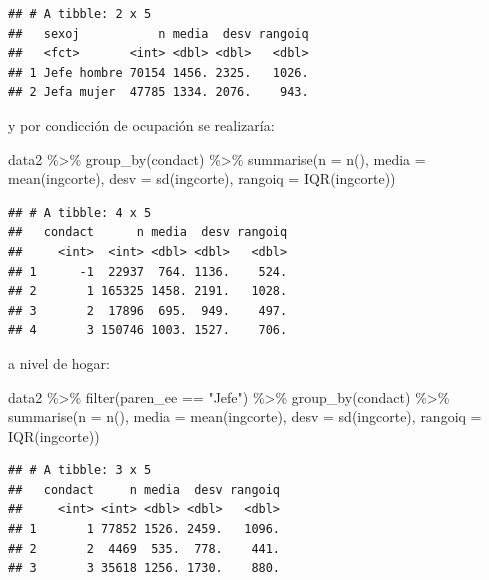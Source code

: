 \documentclass[
  12pt,
]{book}
\newenvironment{Shaded}{\begin{snugshade}}{\end{snugshade}}
\newcommand{\AttributeTok}[1]{\textcolor[rgb]{0.77,0.63,0.00}{#1}}
\newcommand{\FunctionTok}[1]{\textcolor[rgb]{0.00,0.00,0.00}{#1}}
\newcommand{\NormalTok}[1]{#1}
\newcommand{\SpecialCharTok}[1]{\textcolor[rgb]{0.00,0.00,0.00}{#1}}
\newcommand{\StringTok}[1]{\textcolor[rgb]{0.31,0.60,0.02}{#1}}
\begin{document}
\begin{verbatim}
## # A tibble: 2 x 5
##   sexoj           n media  desv rangoiq
##   <fct>       <int> <dbl> <dbl>   <dbl>
## 1 Jefe hombre 70154 1456. 2325.   1026.
## 2 Jefa mujer  47785 1334. 2076.    943.
\end{verbatim}

y por condicción de ocupación se realizaría:

\begin{Shaded}
\begin{Highlighting}[]
\NormalTok{data2 }\SpecialCharTok{\%\textgreater{}\%} \FunctionTok{group\_by}\NormalTok{(condact) }\SpecialCharTok{\%\textgreater{}\%}
  \FunctionTok{summarise}\NormalTok{(}\AttributeTok{n =} \FunctionTok{n}\NormalTok{(),}
            \AttributeTok{media =} \FunctionTok{mean}\NormalTok{(ingcorte),}
            \AttributeTok{desv =} \FunctionTok{sd}\NormalTok{(ingcorte),}
            \AttributeTok{rangoiq =} \FunctionTok{IQR}\NormalTok{(ingcorte))}
\end{Highlighting}
\end{Shaded}

\begin{verbatim}
## # A tibble: 4 x 5
##   condact      n media  desv rangoiq
##     <int>  <int> <dbl> <dbl>   <dbl>
## 1      -1  22937  764. 1136.    524.
## 2       1 165325 1458. 2191.   1028.
## 3       2  17896  695.  949.    497.
## 4       3 150746 1003. 1527.    706.
\end{verbatim}

a nivel de hogar:

\begin{Shaded}
\begin{Highlighting}[]
\NormalTok{data2 }\SpecialCharTok{\%\textgreater{}\%} \FunctionTok{filter}\NormalTok{(paren\_ee }\SpecialCharTok{==} \StringTok{"Jefe"}\NormalTok{) }\SpecialCharTok{\%\textgreater{}\%} 
  \FunctionTok{group\_by}\NormalTok{(condact) }\SpecialCharTok{\%\textgreater{}\%}
  \FunctionTok{summarise}\NormalTok{(}\AttributeTok{n =} \FunctionTok{n}\NormalTok{(),}
            \AttributeTok{media =} \FunctionTok{mean}\NormalTok{(ingcorte),}
            \AttributeTok{desv =} \FunctionTok{sd}\NormalTok{(ingcorte),}
            \AttributeTok{rangoiq =} \FunctionTok{IQR}\NormalTok{(ingcorte))}
\end{Highlighting}
\end{Shaded}

\begin{verbatim}
## # A tibble: 3 x 5
##   condact     n media  desv rangoiq
##     <int> <int> <dbl> <dbl>   <dbl>
## 1       1 77852 1526. 2459.   1096.
## 2       2  4469  535.  778.    441.
## 3       3 35618 1256. 1730.    880.
\end{verbatim}
\end{document}
